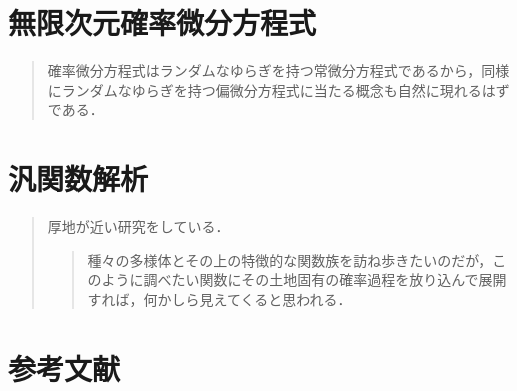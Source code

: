 \documentclass[uplatex,dvipdfmx]{jsreport}
\begin{document}
\chapter{無限次元確率微分方程式}

\begin{quotation}
    確率微分方程式はランダムなゆらぎを持つ常微分方程式であるから，同様にランダムなゆらぎを持つ偏微分方程式に当たる概念も自然に現れるはずである．
\end{quotation}

\chapter{汎関数解析}

\begin{quotation}
    厚地\cite{厚地}が近い研究をしている．
    \begin{quote}
        種々の多様体とその上の特徴的な関数族を訪ね歩きたいのだが，このように調べたい関数にその土地固有の確率過程を放り込んで展開すれば，何かしら見えてくると思われる．
    \end{quote}
\end{quotation}



\chapter{参考文献}
\end{document}
